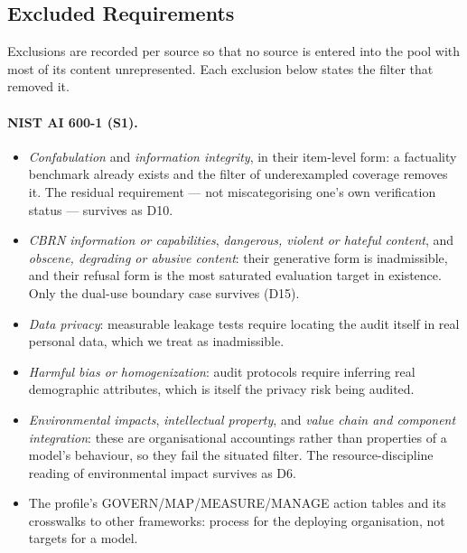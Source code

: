 \subsection{Excluded Requirements}\label{app:excluded}

Exclusions are recorded per source so that no source is entered into the pool with most of its content unrepresented. Each exclusion below states the filter that removed it.

\paragraph{NIST AI 600-1 (S1).}
\begin{itemize}
\item \emph{Confabulation} and \emph{information integrity}, in their item-level form: a factuality benchmark already exists and the filter of underexampled coverage removes it. The residual requirement --- not miscategorising one's own verification status --- survives as D10.
\item \emph{CBRN information or capabilities}, \emph{dangerous, violent or hateful content}, and \emph{obscene, degrading or abusive content}: their generative form is inadmissible, and their refusal form is the most saturated evaluation target in existence. Only the dual-use boundary case survives (D15).
\item \emph{Data privacy}: measurable leakage tests require locating the audit itself in real personal data, which we treat as inadmissible.
\item \emph{Harmful bias or homogenization}: audit protocols require inferring real demographic attributes, which is itself the privacy risk being audited.
\item \emph{Environmental impacts}, \emph{intellectual property}, and \emph{value chain and component integration}: these are organisational accountings rather than properties of a model's behaviour, so they fail the situated filter. The resource-discipline reading of environmental impact survives as D6.
\item The profile's GOVERN/MAP/MEASURE/MANAGE action tables and its crosswalks to other frameworks: process for the deploying organisation, not targets for a model.
\end{itemize}

